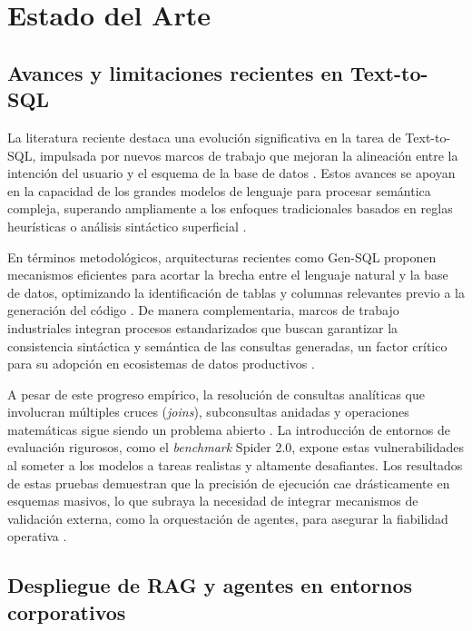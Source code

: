\section{Estado del Arte}

\subsection{Avances y limitaciones recientes en Text-to-SQL}

La literatura reciente destaca una evolución significativa en la tarea de
Text-to-SQL, impulsada por nuevos marcos de trabajo que mejoran la alineación
entre la intención del usuario y el esquema de la base de datos
\citep{qin2024gensql}. Estos avances se apoyan en la capacidad de los grandes
modelos de lenguaje para procesar semántica compleja, superando ampliamente a
los enfoques tradicionales basados en reglas heurísticas o análisis
sintáctico superficial \citep{luo2024nl2sql}.

En términos metodológicos, arquitecturas recientes como Gen-SQL proponen
mecanismos eficientes para acortar la brecha entre el lenguaje natural y la
base de datos, optimizando la identificación de tablas y columnas relevantes
previo a la generación del código \citep{qin2024gensql}. De manera
complementaria, marcos de trabajo industriales integran procesos estandarizados
que buscan garantizar la consistencia sintáctica y semántica de las consultas
generadas, un factor crítico para su adopción en ecosistemas de datos
productivos \citep{gladkykh2025datrics}.

A pesar de este progreso empírico, la resolución de consultas analíticas que
involucran múltiples cruces (\textit{joins}), subconsultas anidadas y
operaciones matemáticas sigue siendo un problema abierto \citep{luo2024nl2sql}.
La introducción de entornos de evaluación rigurosos, como el \textit{benchmark}
Spider 2.0, expone estas vulnerabilidades al someter a los modelos a tareas
realistas y altamente desafiantes. Los resultados de estas pruebas demuestran
que la precisión de ejecución cae drásticamente
en esquemas masivos, lo que subraya la necesidad de integrar mecanismos de
validación externa, como la orquestación de agentes, para asegurar la fiabilidad
operativa \citep{lei2024spider}.

\subsection{Despliegue de RAG y agentes en entornos corporativos}


